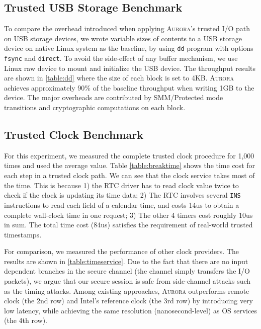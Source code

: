 \documentclass[journal,twocolumn,letterpaper,10pt]{IEEEtran}
\begin{document}
\subsection{Trusted USB Storage Benchmark}

To compare the overhead introduced when applying \textsc{Aurora}'s trusted I/O path on USB storage devices, we wrote variable sizes of contents to a USB storage device on native Linux system as the baseline, by using \texttt{dd} program with options \texttt{fsync} and \texttt{direct}. To avoid the side-effect of any buffer mechanism, we use Linux raw device to mount and initialize the USB device. %
The throughput results are shown in \autoref{table:dd} where the size of each block is set to 4KB. \textsc{Aurora} achieves approximately 90\% of the baseline throughput when writing 1GB to the device. The major overheads are contributed by SMM/Protected mode transitions and cryptographic computations on each block.

\subsection{Trusted Clock Benchmark}\label{time_bench}

For this experiment, we measured the complete trusted clock procedure for 1,000 times and used the average value. Table \ref{table:breaktime} shows the time cost for each step in a trusted clock path. We can see that the clock service takes most of the time. This is because 1) the RTC driver has to read clock value twice to check if the clock is updating its time data; 2) The RTC involves several \texttt{INS} instructions to read each field of a calendar time, and costs 14us to obtain a complete wall-clock time in one request; 3) The other 4 timers cost roughly 10us in sum. The total  time cost (84us) satisfies the requirement of real-world trusted timestamps.

For comparison, we measured the performance of other clock providers. The results are shown in \autoref{table:timeservice}. Due to the fact that there are no input dependent branches in the secure channel (the channel simply transfers the I/O packets), we argue that our secure session is safe from side-channel attacks such as the timing attacks. 
Among existing approaches, \textsc{Aurora} outperforms remote clock (the 2nd row) and Intel's reference clock (the 3rd row) by introducing very low latency, while achieving the same resolution (nanosecond-level) as OS services (the 4th row). 
\end{document}
